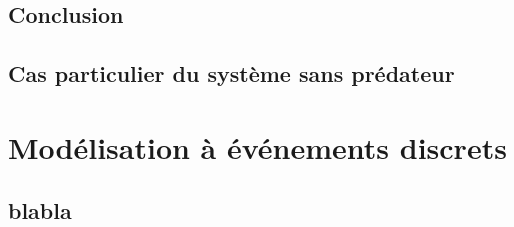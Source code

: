 \documentclass[a4paper, 11pt]{report}%
\begin{document}
        \subsection{Conclusion}

        \subsection{Cas particulier du système sans prédateur}

    \section{Modélisation à événements discrets}
        \subsection{blabla}

    \nocite{*}
    
    
\end{document}
